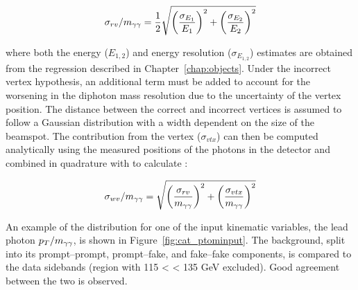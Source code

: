 \begin{equation}
  \sigma_{rv}/m_{\gamma\gamma} = \frac{1}{2} \sqrt{\left(\frac{\sigma_{E_1}}{E_1}\right)^{2}
                              + \left(\frac{\sigma_{E_2}}{E_2}\right)^{2}}
\end{equation}

where both the energy ($E_{1,2}$) and energy resolution ($\sigma_{E_{1,2}}$) estimates 
are obtained from the regression described in Chapter~\ref{chap:objects}.
Under the incorrect vertex hypothesis, an additional term must be added to account for the 
worsening in the diphoton mass resolution due to the uncertainty of the vertex position.
The distance between the correct and incorrect vertices is assumed to follow a Gaussian distribution
with a width dependent on the size of the beamspot.
The contribution from the vertex ($\sigma_{vtx}$) can then be computed analytically 
using the measured positions of the photons in the detector 
and combined in quadrature with \srv to calculate \swv:

\begin{equation}
  \sigma_{wv}/m_{\gamma\gamma} = \sqrt{\left(\frac{\sigma_{rv}}{m_{\gamma\gamma}}\right)^{2}
                              + \left(\frac{\sigma_{vtx}}{m_{\gamma\gamma}}\right)^{2}}
\end{equation}

An example of the distribution for one of the input kinematic variables, the lead photon $p_T/m_{\gamma\gamma}$, 
is shown in Figure~\ref{fig:cat_ptominput}.
The background, split into its prompt--prompt, prompt--fake, and fake--fake components, 
is compared to the data sidebands (region with 115 < \mgg < 135 GeV excluded).
Good agreement between the two is observed.

